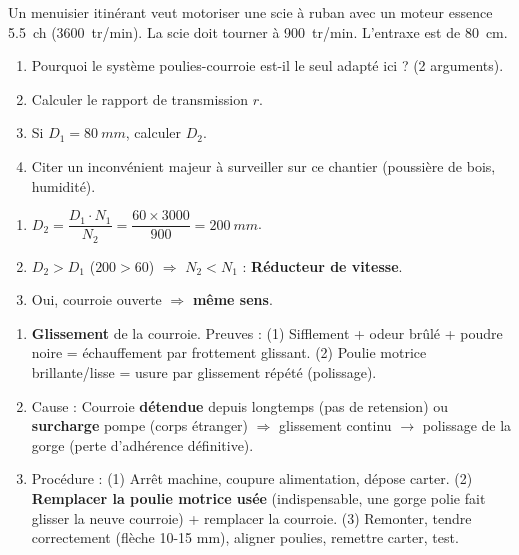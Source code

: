 \documentclass[11pt]{article}
\begin{document}
\begin{exercice}
Un menuisier itinérant veut motoriser une scie à ruban avec un moteur essence \SI{5,5}{ch} (\SI{3600}{tr/min}). La scie doit tourner à \SI{900}{tr/min}. L'entraxe est de \SI{80}{cm}.
\begin{enumerate}
\item Pourquoi le système poulies-courroie est-il le seul adapté ici ? (2 arguments).
\item Calculer le rapport de transmission $r$.
\item Si $D_1 = \SI{80}{mm}$, calculer $D_2$.
\item Citer un inconvénient majeur à surveiller sur ce chantier (poussière de bois, humidité).
\end{enumerate}
\end{exercice}

\begin{corrige}
\begin{enumerate}
\item $D_2 = \dfrac{D_1 \cdot N_1}{N_2} = \dfrac{60 \times 3000}{900} = \SI{200}{mm}$.
\item $D_2 > D_1$ ($200 > 60$) $\Rightarrow$ $N_2 < N_1$ : \textbf{Réducteur de vitesse}.
\item Oui, courroie ouverte $\Rightarrow$ \textbf{même sens}.
\end{enumerate}
\end{corrige}

\begin{corrige}
\begin{enumerate}
\item \textbf{Glissement} de la courroie. Preuves : (1) Sifflement + odeur brûlé + poudre noire = échauffement par frottement glissant. (2) Poulie motrice brillante/lisse = usure par glissement répété (polissage).
\item Cause : Courroie \textbf{détendue} depuis longtemps (pas de retension) ou \textbf{surcharge} pompe (corps étranger) $\Rightarrow$ glissement continu $\rightarrow$ polissage de la gorge (perte d'adhérence définitive).
\item Procédure : (1) Arrêt machine, coupure alimentation, dépose carter. (2) \textbf{Remplacer la poulie motrice usée} (indispensable, une gorge polie fait glisser la neuve courroie) + remplacer la courroie. (3) Remonter, tendre correctement (flèche 10-15 mm), aligner poulies, remettre carter, test.
\end{enumerate}
\end{corrige}
\end{document}
